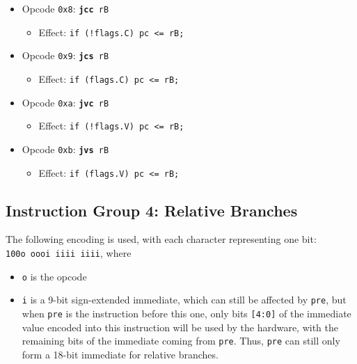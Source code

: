 \documentclass{article}
\begin{document}
\begin{itemize}
		\item Opcode \texttt{0x8}:
			\texttt{\textbf{jcc} rB}
		\begin{itemize}
			\item Effect:
				\texttt{if (!flags.C) pc <= rB;}
		\end{itemize}
		\item Opcode \texttt{0x9}:
			\texttt{\textbf{jcs} rB}
		\begin{itemize}
			\item Effect:
				\texttt{if (flags.C) pc <= rB;}
		\end{itemize}
		\item Opcode \texttt{0xa}:
			\texttt{\textbf{jvc} rB}
		\begin{itemize}
			\item Effect:
				\texttt{if (!flags.V) pc <= rB;}
		\end{itemize}
		\item Opcode \texttt{0xb}:
			\texttt{\textbf{jvs} rB}
		\begin{itemize}
			\item Effect:
				\texttt{if (flags.V) pc <= rB;}
		\end{itemize}
	\end{itemize}

	\doublespacing

	\subsection{Instruction Group 4:  Relative Branches}
	The following encoding is used, with each character representing one
	bit:  \\
	\texttt{100o oooi iiii iiii}, where

	\singlespacing
	\begin{itemize}
		\item \texttt{o} is the opcode
		\item \texttt{i} is a 9-bit sign-extended immediate, which can
		still be affected by \texttt{pre}, but when \texttt{pre} is the
		instruction before this one, only bits \texttt{[4:0]} of the
		immediate value encoded into this instruction will be used by the
		hardware, with the remaining bits of the immediate coming from
		\texttt{pre}.  Thus, \texttt{pre} can still only form a 18-bit
		immediate for relative branches.
	\end{itemize}
	\doublespacing
\end{document}
